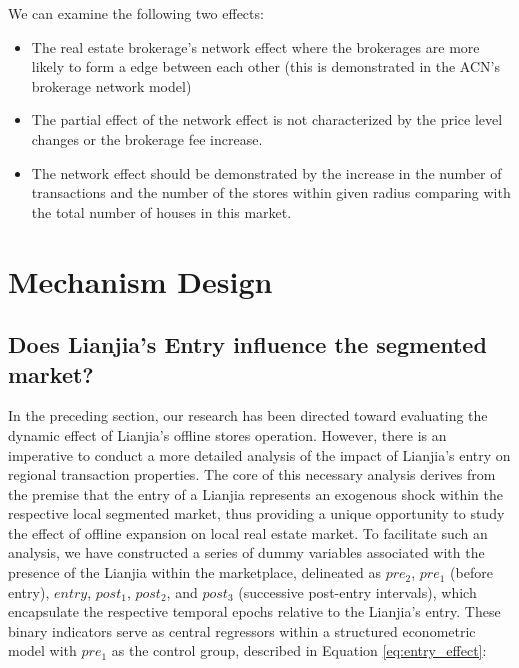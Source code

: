 \documentclass[12pt]{article}
\begin{document}












We can examine the following two effects:

\begin{itemize}
  \item The real estate brokerage's network effect where the brokerages are more likely to form a edge between each other (this is demonstrated in the ACN's brokerage network model)
  \item The partial effect of the network effect is not characterized by the price level changes or the brokerage fee increase.
  \item The network effect should be demonstrated by the increase in the number of transactions and the number of the stores within given radius comparing with the total number of houses in this market.
\end{itemize}



\section{Mechanism Design} \label{sec:mechanism_design}

\subsection{Does Lianjia's Entry influence the segmented market?} \label{subsec:entry_effect}

In the preceding section, our research has been directed toward evaluating the dynamic effect of Lianjia's offline stores operation. However, there is an imperative to conduct a more detailed analysis of the impact of Lianjia's entry on regional transaction properties. The core of this necessary analysis derives from the premise that the entry of a Lianjia represents an exogenous shock within the respective local segmented market, thus providing a unique opportunity to study the effect of offline expansion on local real estate market. To facilitate such an analysis, we have constructed a series of dummy variables associated with the presence of the Lianjia within the marketplace, delineated as $pre_2$, $pre_1$ (before entry), $entry$, $post_1$, $post_2$, and $post_3$ (successive post-entry intervals), which encapsulate the respective temporal epochs relative to the Lianjia's entry. These binary indicators serve as central regressors within a structured econometric model with $pre_1$ as the control group, described in Equation \eqref{eq:entry_effect}:
\end{document}
